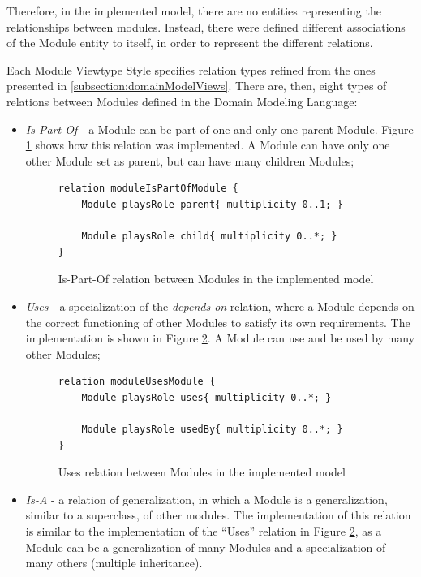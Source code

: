\documentclass{llncs}
\begin{document}
Therefore, in the implemented model, there are no entities representing the relationships between modules. Instead, there were defined different associations of the Module entity to itself, in order to represent the different relations.

Each Module Viewtype Style specifies relation types refined from the ones presented in \ref{subsection:domainModelViews}. There are, then, eight types of relations between Modules\cite{clements2003documenting} defined in the Domain Modeling Language:
\begin{itemize}
\item \textit{Is-Part-Of} - a Module can be part of one and only one parent Module. Figure \ref{figure:modelIsPartOfRelation} shows how this relation was implemented. A Module can have only one other Module set as parent, but can have many children Modules;
\begin{figure}
\centering
\lstset{style=customjava}
\begin{lstlisting}
relation moduleIsPartOfModule {
	Module playsRole parent{ multiplicity 0..1; }
	
	Module playsRole child{ multiplicity 0..*; }
}
\end{lstlisting}
\caption{Is-Part-Of relation between Modules in the implemented model}
\label{figure:modelIsPartOfRelation}
\end{figure}

\item \textit{Uses} - a specialization of the \textit{depends-on} relation, where a Module depends on the correct functioning of other Modules to satisfy its own requirements. The implementation is shown in Figure \ref{figure:modelUsesRelation}. A Module can use and be used by many other Modules;
\begin{figure}
\lstset{style=customjava}
\begin{lstlisting}
relation moduleUsesModule {
	Module playsRole uses{ multiplicity 0..*; }
	
	Module playsRole usedBy{ multiplicity 0..*; }
}
\end{lstlisting}
\caption{Uses relation between Modules in the implemented model}
\label{figure:modelUsesRelation}
\end{figure}

\item \textit{Is-A} - a relation of generalization, in which a Module is a generalization, similar to a superclass, of other modules. The implementation of this relation is similar to the implementation of the ``Uses'' relation in Figure \ref{figure:modelUsesRelation}, as a Module can be a generalization of many Modules and a specialization of many others (multiple inheritance).


\end{itemize}
\end{document}
